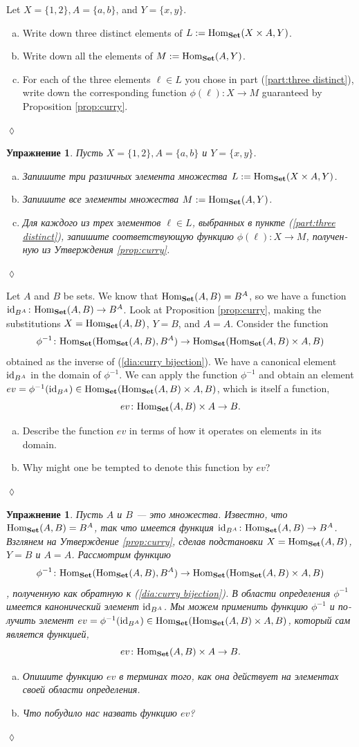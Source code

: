 \documentclass[a4paper]{book}
\def\tn{\textnormal}
\def\Hom{\tn{Hom}}
\def\to{\rightarrow}
\def\taking{\colon}
\def\m1{{-1}}
\def\id{\tn{id}}
\def\Set{{\bf Set}}
\theoremstyle{myth}
\newtheorem{excENG}[envENG]{\begin{english}Exercise\end{english}}
\newenvironment{exerciseENG}{\begin{excENG}}{\hspace*{\fill}$\lozenge$\end{excENG}}
\newtheorem{excRUS}[envRUS]{Упражнение}
\newenvironment{exerciseRUS}{\begin{excRUS}}{\hspace*{\fill}$\lozenge$\end{excRUS}}
\def\sexc{\begin{enumerate}[a.)]\setlength{\itemsep}{.1cm}\setlength{\parskip}{.1cm}\item}
\def\next{\item}
\def\endsexc{\end{enumerate}}
\begin{document}
\begin{russian}
\begin{exerciseENG}
Let $X=\{1,2\}, A=\{a,b\}$, and $Y=\{x,y\}$. 
\sexc\label{part:three distinct} Write down three distinct elements of $L:=\Hom_\Set(X\times A,Y)$. 
\next Write down all the elements of $M:=\Hom_\Set(A,Y)$. 
\next For each of the three elements $\ell\in L$ you chose in part (\ref{part:three distinct}), write down the corresponding function $\phi(\ell)\taking X\to M$ guaranteed by Proposition \ref{prop:curry}.
\endsexc
\end{exerciseENG}

\begin{exerciseRUS}
Пусть $X=\{1,2\}, A=\{a,b\}$ и $Y=\{x,y\}$. 
\sexc\label{part:three distinct} Запишите три различных элемента множества $L:=\Hom_\Set(X\times A,Y)$. 
\next Запишите все элементы множества $M:=\Hom_\Set(A,Y)$. 
\next Для каждого из трех элементов $\ell\in L$, выбранных в пункте (\ref{part:three distinct}), запишите соответствующую функцию $\phi(\ell)\taking X\to M$, полученную из Утверждения \ref{prop:curry}.
\endsexc
\end{exerciseRUS}

\begin{exerciseENG}\label{exc:evaluation}
Let $A$ and $B$ be sets. We know that $\Hom_\Set(A,B)=B^A$, so we have a function $\id_{B^A}\taking\Hom_\Set(A,B)\to B^A$. Look at Proposition \ref{prop:curry}, making the substitutions $X=\Hom_\Set(A,B)$, $Y=B$, and  $A=A$. Consider the function $$\phi^\m1\taking\Hom_\Set(\Hom_\Set(A,B),B^A)\to\Hom_\Set(\Hom_\Set(A,B)\times A,B)$$ obtained as the inverse of (\ref{dia:curry bijection}). We have a canonical element $\id_{B^A}$ in the domain of $\phi^\m1$. We can apply the function $\phi^\m1$ and obtain an element $ev=\phi^\m1(\id_{B^A})\in\Hom_\Set(\Hom_\Set(A,B)\times A,B)$, which is itself a function, $$ev\taking\Hom_\Set(A,B)\times A\to B.$$ 
\sexc Describe the function $ev$ in terms of how it operates on elements in its domain. 
\next Why might one be tempted to denote this function by $ev$?
\endsexc
\end{exerciseENG}

\begin{exerciseRUS}\label{exc:evaluation}
Пусть $A$ и $B$ — это множества. Известно, что $\Hom_\Set(A,B)=B^A$, так что имеется функция $\id_{B^A}\taking\Hom_\Set(A,B)\to B^A$. Взглянем на Утверждение \ref{prop:curry}, сделав подстановки $X=\Hom_\Set(A,B)$, $Y=B$ и  $A=A$. Рассмотрим функцию $$\phi^\m1\taking\Hom_\Set(\Hom_\Set(A,B),B^A)\to\Hom_\Set(\Hom_\Set(A,B)\times A,B)$$, полученную как обратную к (\ref{dia:curry bijection}). В области определения $\phi^\m1$ имеется канонический элемент $\id_{B^A}$. Мы можем применить функцию $\phi^\m1$ и получить элемент $ev=\phi^\m1(\id_{B^A})\in\Hom_\Set(\Hom_\Set(A,B)\times A,B)$, который сам является функцией, $$ev\taking\Hom_\Set(A,B)\times A\to B.$$ 
\sexc Опишите функцию $ev$ в терминах того, как она действует на элементах своей области определения. 
\next Что побудило нас назвать функцию $ev$?%
\endsexc
\end{exerciseRUS}


\end{russian}
\end{document}
